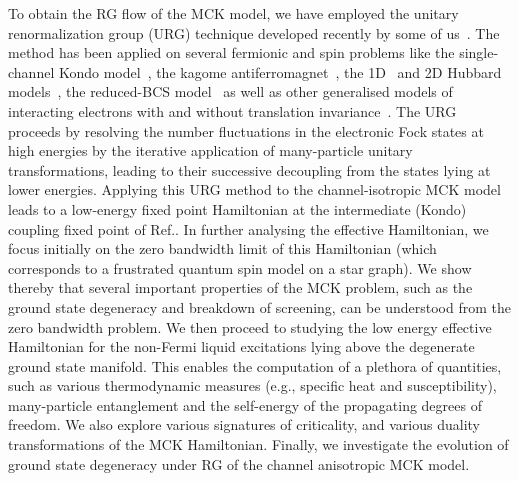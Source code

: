 \documentclass[reprint,prb,superscriptaddress]{revtex4-2}
\begin{document}
To obtain the RG flow of the MCK model, we have employed the unitary renormalization group (URG) technique developed recently by  some of us~\cite{anirbanurg1,anirbanurg2}. The method has been applied on several fermionic and spin problems like the single-channel Kondo model~\cite{kondo_urg}, the kagome antiferromagnet~\cite{santanukagome}, the 1D~\cite{1dhubjhep} and 2D Hubbard models~\cite{anirbanmott1,anirbanmott2,mukherjeeMERG2022}, the reduced-BCS model~\cite{siddharthacpi} as well as other generalised models of interacting electrons with and without translation invariance~\cite{anirbanurg2}.
The URG proceeds by resolving the number fluctuations in the electronic Fock states at high energies by the iterative application of many-particle unitary transformations, leading to their successive decoupling from the states lying at lower energies. Applying this URG method to the channel-isotropic MCK model leads to a low-energy fixed point Hamiltonian at the intermediate (Kondo) coupling fixed point of Ref.\cite{Noz_blandin_1980}. In further analysing the effective Hamiltonian, we focus initially on the zero bandwidth limit of this Hamiltonian (which corresponds to a frustrated quantum spin model on a star graph). We show thereby that several important properties of the MCK problem, such as the ground state degeneracy and breakdown of screening, can be understood from the zero bandwidth problem.
We then proceed to studying the low energy effective Hamiltonian for the non-Fermi liquid excitations lying above the degenerate ground state manifold. This enables the computation of a plethora of quantities, such as various thermodynamic measures (e.g., specific heat and susceptibility), many-particle entanglement and the self-energy of the propagating degrees of freedom. We also explore various signatures of criticality, and various duality transformations of the MCK Hamiltonian. Finally, we investigate the evolution of ground state degeneracy under RG of the channel anisotropic MCK model.
\end{document}
